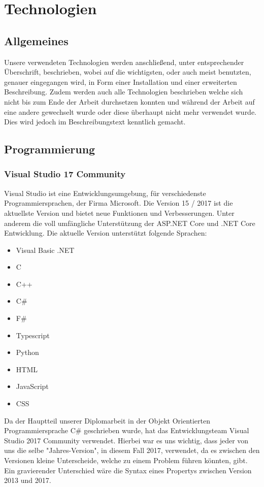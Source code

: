 \section{Technologien}
\subsection{Allgemeines}
Unsere verwendeten Technologien werden anschließend, unter entsprechender Überschrift, beschrieben, wobei auf die wichtigsten, oder auch meist benutzten, genauer eingegangen wird, in Form einer Installation und einer erweiterten Beschreibung. Zudem werden auch alle Technologien beschrieben welche sich nicht bis zum Ende der Arbeit durchsetzen konnten und während der Arbeit auf eine andere gewechselt wurde oder diese überhaupt nicht mehr verwendet wurde. Dies wird jedoch im Beschreibungstext kenntlich gemacht.
\subsection{Programmierung}
\subsubsection {Visual Studio 17 Community}
Visual Studio ist eine Entwicklungsumgebung, für verschiedenste Programmiersprachen, der Firma Microsoft. Die Version 15 / 2017 ist die aktuellste Version und bietet neue Funktionen und Verbesserungen. Unter anderem die voll umfängliche Unterstützung der ASP.NET Core und .NET Core Entwicklung. Die aktuelle Version unterstützt folgende Sprachen:
\begin{itemize}
\item Visual Basic .NET
\item C
\item C++
\item C\#
\item F\#
\item Typescript
\item Python
\item HTML
\item JavaScript
\item CSS
\end{itemize}

Da der Hauptteil unserer Diplomarbeit in der Objekt Orientierten Programmiersprache C\# geschrieben wurde, hat das Entwicklungsteam Visual Studio 2017 Community verwendet. Hierbei war es uns wichtig, dass jeder von uns die selbe "Jahres-Version", in diesem Fall 2017, verwendet, da es zwischen den Versionen kleine Unterscheide, welche zu einem Problem führen könnten, gibt. Ein gravierender Unterschied wäre die Syntax eines Propertys zwischen Version 2013 und 2017. 

